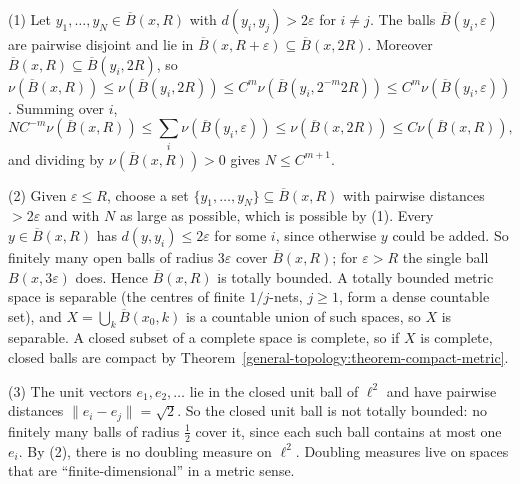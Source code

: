 \begin{solution}
(1) Let $y_1, \ldots, y_N \in \overline{B}(x, R)$ with $d(y_i, y_j) > 2\varepsilon$ for $i \neq j$. The balls $\overline{B}(y_i, \varepsilon)$ are pairwise disjoint and lie in $\overline{B}(x, R + \varepsilon) \subseteq \overline{B}(x, 2R)$.
Moreover $\overline{B}(x, R) \subseteq \overline{B}(y_i, 2R)$, so
$\nu(\overline{B}(x, R)) \leq \nu(\overline{B}(y_i, 2R)) \leq C^m\nu(\overline{B}(y_i, 2^{-m}2R)) \leq C^m\nu(\overline{B}(y_i, \varepsilon))$. Summing over $i$,
\[
NC^{-m}\nu(\overline{B}(x, R)) \leq \sum_i\nu(\overline{B}(y_i, \varepsilon)) \leq \nu(\overline{B}(x, 2R)) \leq C\nu(\overline{B}(x, R)),
\]
and dividing by $\nu(\overline{B}(x, R)) > 0$ gives $N \leq C^{m+1}$.

(2) Given $\varepsilon \leq R$, choose a set $\{y_1, \ldots, y_N\} \subseteq \overline{B}(x, R)$ with pairwise distances $> 2\varepsilon$ and with $N$ as large as possible, which is possible by (1). Every
$y \in \overline{B}(x, R)$ has $d(y, y_i) \leq 2\varepsilon$ for some $i$, since otherwise $y$ could be added. So finitely many open balls of radius $3\varepsilon$ cover $\overline{B}(x, R)$; for
$\varepsilon > R$ the single ball $B(x, 3\varepsilon)$ does. Hence $\overline{B}(x, R)$ is totally bounded. A totally bounded metric space is separable (the centres of finite $1/j$-nets, $j \geq 1$, form a
dense countable set), and $X = \bigcup_k\overline{B}(x_0, k)$ is a countable union of such spaces, so $X$ is separable. A closed subset of a complete space is complete, so if $X$ is complete, closed balls
are compact by Theorem~\ref{general-topology:theorem-compact-metric}.

(3) The unit vectors $e_1, e_2, \ldots$ lie in the closed unit ball of $\ell^2$ and have pairwise distances $\|e_i - e_j\| = \sqrt2$. So the closed unit ball is not totally bounded: no finitely many balls of
radius $\frac12$ cover it, since each such ball contains at most one $e_i$. By (2), there is no doubling measure on $\ell^2$. Doubling measures live on spaces that are ``finite-dimensional'' in a metric sense.
\end{solution}
